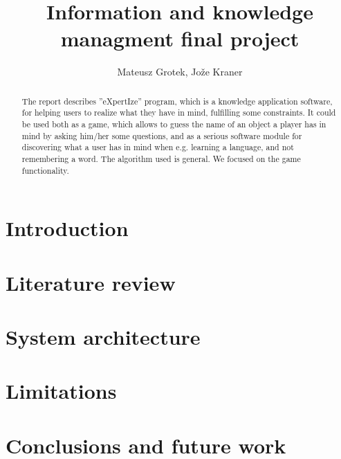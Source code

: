\documentclass[a4paper]{article}
\title{Information and knowledge managment final project }
\author{Mateusz Grotek, Jože Kraner}
\date{}
\begin{document}
\maketitle
\begin{abstract}
The report describes ''eXpertIze'' program, which is a knowledge application software, for helping users to realize what they have in mind, fulfilling some constraints. It could be used both as a game, which allows to guess the name of an object a player has in mind by asking him/her some questions, and as a serious software module for discovering what a user has in mind when e.g. learning a language, and not remembering a word. The algorithm used is general. We focused on the game functionality.
\end{abstract}
\tableofcontents
\section{Introduction}
\section{Literature review}
\section{System architecture}
\section{Limitations}

\section{Conclusions and future work}

\begin{thebibliography}{000000000000000000000000000}
\end{thebibliography}
\end{document}
